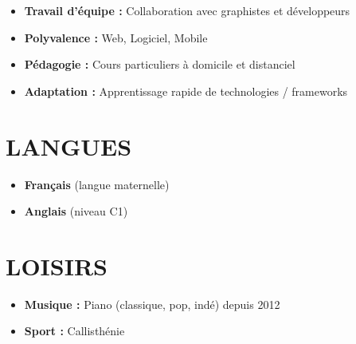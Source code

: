 \documentclass[10pt,a4paper]{article}
\begin{document}
\begin{minipage}[t]{0.30\linewidth}
\begin{itemize}
  \item \textbf{Travail d'équipe :} Collaboration avec graphistes et développeurs
  \item \textbf{Polyvalence :} Web, Logiciel, Mobile
  \item \textbf{Pédagogie :} Cours particuliers à domicile et distanciel
  \item \textbf{Adaptation :} Apprentissage rapide de technologies / frameworks
\end{itemize}

\section*{LANGUES}

\begin{itemize}
  \item \textbf{Français} (langue maternelle)
  \item \textbf{Anglais} (niveau C1)
\end{itemize}

\section*{LOISIRS}

\begin{itemize}
  \item \textbf{Musique :} Piano (classique, pop, indé) depuis 2012
  \item \textbf{Sport :} Callisthénie
\end{itemize}

\end{minipage}%
\hfill
\end{document}
